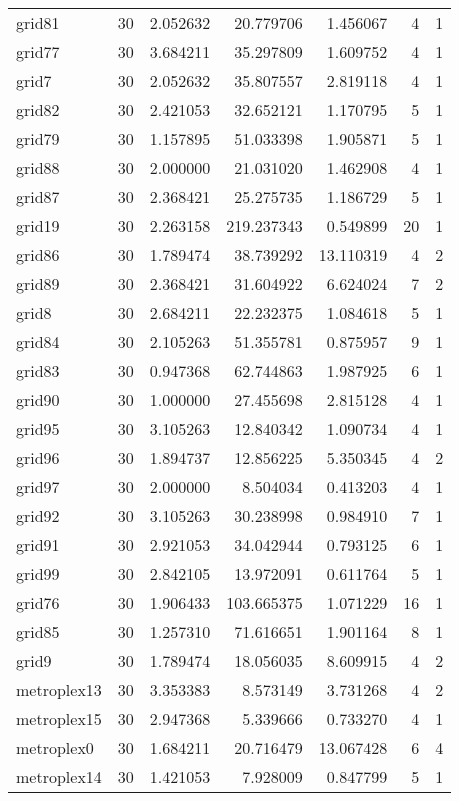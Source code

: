 \documentclass[../../../thesis.tex]{subfiles}
\begin{document}
\begin{longtable}{|l|r|r|r|r|r|r|}
grid81 & 30 & 2.052632 & 20.779706 & 1.456067 & 4 & 1 \\
grid77 & 30 & 3.684211 & 35.297809 & 1.609752 & 4 & 1 \\
grid7 & 30 & 2.052632 & 35.807557 & 2.819118 & 4 & 1 \\
grid82 & 30 & 2.421053 & 32.652121 & 1.170795 & 5 & 1 \\
grid79 & 30 & 1.157895 & 51.033398 & 1.905871 & 5 & 1 \\
grid88 & 30 & 2.000000 & 21.031020 & 1.462908 & 4 & 1 \\
grid87 & 30 & 2.368421 & 25.275735 & 1.186729 & 5 & 1 \\
grid19 & 30 & 2.263158 & 219.237343 & 0.549899 & 20 & 1 \\
grid86 & 30 & 1.789474 & 38.739292 & 13.110319 & 4 & 2 \\
grid89 & 30 & 2.368421 & 31.604922 & 6.624024 & 7 & 2 \\
grid8 & 30 & 2.684211 & 22.232375 & 1.084618 & 5 & 1 \\
grid84 & 30 & 2.105263 & 51.355781 & 0.875957 & 9 & 1 \\
grid83 & 30 & 0.947368 & 62.744863 & 1.987925 & 6 & 1 \\
grid90 & 30 & 1.000000 & 27.455698 & 2.815128 & 4 & 1 \\
grid95 & 30 & 3.105263 & 12.840342 & 1.090734 & 4 & 1 \\
grid96 & 30 & 1.894737 & 12.856225 & 5.350345 & 4 & 2 \\
grid97 & 30 & 2.000000 & 8.504034 & 0.413203 & 4 & 1 \\
grid92 & 30 & 3.105263 & 30.238998 & 0.984910 & 7 & 1 \\
grid91 & 30 & 2.921053 & 34.042944 & 0.793125 & 6 & 1 \\
grid99 & 30 & 2.842105 & 13.972091 & 0.611764 & 5 & 1 \\
grid76 & 30 & 1.906433 & 103.665375 & 1.071229 & 16 & 1 \\
grid85 & 30 & 1.257310 & 71.616651 & 1.901164 & 8 & 1 \\
grid9 & 30 & 1.789474 & 18.056035 & 8.609915 & 4 & 2 \\
metroplex13 & 30 & 3.353383 & 8.573149 & 3.731268 & 4 & 2 \\
metroplex15 & 30 & 2.947368 & 5.339666 & 0.733270 & 4 & 1 \\
metroplex0 & 30 & 1.684211 & 20.716479 & 13.067428 & 6 & 4 \\
metroplex14 & 30 & 1.421053 & 7.928009 & 0.847799 & 5 & 1 \\

\end{longtable}
\end{document}
